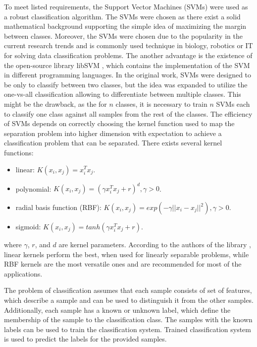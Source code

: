 To meet listed requirements, the Support Vector Machines (SVMs)\cite{Cortes:SVM} were used as a robust classification algorithm.
The SVMs were chosen as there exist a solid mathematical background supporting the simple idea of maximizing the margin between classes.
Moreover, the SVMs were chosen due to the popularity in the current research trends and is commonly used technique in biology, robotics or IT for solving data classification problems.
The another advantage is the existence of the open-source library libSVM \cite{libSVM}, which contains the implementation of the SVM in different programming languages.
In the original work, SVMs were designed to be only to classify between two classes, but the idea was expanded to utilize the one-vs-all classification allowing to differentiate between multiple classes.
This might be the drawback, as the for $n$ classes, it is necessary to train $n$ SVMs each to classify one class against all samples from the rest of the classes. 
The efficiency of SVMs depends on correctly choosing the kernel function used to map the separation problem into higher dimension with expectation to achieve a classification problem that can be separated.
There exists several kernel functions:
\begin{itemize}
\item linear: $K(x_i, x_j) = x_i^Tx_j$.
\item polynomial: $K(x_i, x_j) = (\gamma x_i^Tx_j + r)^d, \gamma > 0$.
\item radial basis function (RBF): $K(x_i, x_j) = exp(-\gamma ||x_i - x_j||^2), \gamma > 0$.
\item sigmoid: $K(x_i, x_j) = tanh(\gamma x_i^Tx_j+r)$.
\end{itemize}
where $\gamma$, $r$, and $d$ are kernel parameters. 
According to the authors of the library \cite{libSVM}, linear kernels perform the best, when used for linearly separable problems, while RBF kernels are the most versatile ones and are recommended for most of the applications.


The problem of classification assumes that each sample consists of set of features, which describe a sample and can be used to distinguish it from the other samples.
Additionally, each sample has a known or unknown label, which define the membership of the sample to the classification class. 
The samples with the known labels can be used to train the classification system.
Trained classification system is used to predict the labels for the provided samples.

